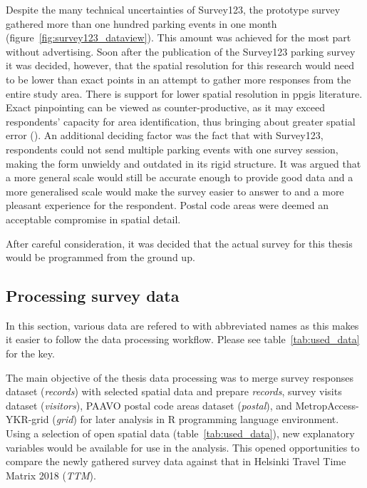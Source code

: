 Despite the many technical uncertainties of Survey123, the prototype survey gathered more than one hundred parking events in one month (figure~\ref{fig:survey123_dataview}). This amount was achieved for the most part without advertising. Soon after the publication of the Survey123 parking survey it was decided, however, that the spatial resolution for this research would need to be lower than exact points in an attempt to gather more responses from the entire study area. There is support for lower spatial resolution in \gls{ppgis} literature. Exact pinpointing can be viewed as counter-productive, as it may exceed respondents' capacity for area identification, thus bringing about greater spatial error (\cite{Brown2012}). An additional deciding factor was the fact that with Survey123, respondents could not send multiple parking events with one survey session, making the form unwieldy and outdated in its rigid structure. It was argued that a more general scale would still be accurate enough to provide good data and a more generalised scale would make the survey easier to answer to and a more pleasant experience for the respondent. Postal code areas were deemed an acceptable compromise in spatial detail.

After careful consideration, it was decided that the actual survey for this thesis would be programmed from the ground up.

\subsection{Processing survey data}
\label{sec:c3-processdata} %
\justify

In this section, various data are refered to with abbreviated names as this makes it easier to follow the data processing workflow. Please see table~\ref{tab:used_data} for the key.

The main objective of the thesis data processing was to merge survey responses dataset (\textit{records}) with selected spatial data and prepare \textit{records}, survey visits dataset (\textit{visitors}), PAAVO postal code areas dataset (\textit{postal}), and MetropAccess-YKR-grid (\textit{grid}) for later analysis in R programming language environment. Using a selection of open spatial data (table~\ref{tab:used_data}), new explanatory variables would be available for use in the analysis. This opened opportunities to compare the newly gathered survey data against that in Helsinki Travel Time Matrix 2018 (\textit{TTM}).

